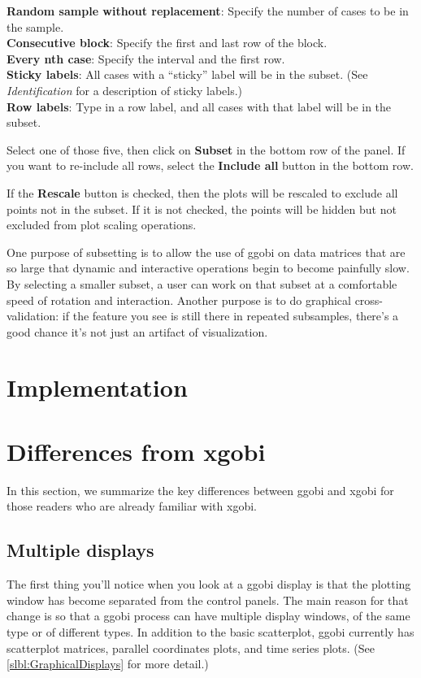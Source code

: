 \documentclass[11pt]{article}
\begin{document}
{\bf Random sample without replacement}:  Specify the number of
cases to be in the sample.
\\{\bf Consecutive block}:  Specify the first and last row of the block.
\\{\bf Every nth case}:  Specify the interval and the first row.
\\{\bf Sticky labels}:  All cases with a ``sticky'' label will
  be in the subset.  (See {\em Identification} for a description
  of sticky labels.)
\\{\bf Row labels}: Type in a row label, and all cases with that
  label will be in the subset.

Select one of those five, then click on {\bf Subset} in the
bottom row of the panel.  If you want to re-include all rows, 
select the {\bf Include all} button in the bottom row.

If the {\bf Rescale} button is checked, then the plots will be
rescaled to exclude all points not in the subset.  If it is
not checked, the points will be hidden but not excluded from
plot scaling operations.

One purpose of subsetting is to allow the use of ggobi on data matrices
that are so large that dynamic and interactive operations begin to
become painfully slow.  By selecting a smaller subset, a user can
work on that subset at a comfortable speed of rotation and
interaction.  Another purpose is to do graphical cross-validation:
if the feature you see is still there in repeated subsamples, there's
a good chance it's not just an artifact of visualization.

\section{Implementation}

\section{Differences from xgobi}
\label{slbl:xgobi}

In this section, we summarize the key differences between ggobi
and xgobi for those readers who are already familiar with xgobi.

\subsection {Multiple displays}

The first thing you'll notice when you look at a ggobi display is
that the plotting window has become separated from the control
panels.  The main reason for that change is so that a ggobi process
can have multiple display windows, of the same type or of different
types.  In addition to the basic scatterplot, ggobi currently has
scatterplot matrices, parallel coordinates plots, and time series
plots.  (See \ref{slbl:GraphicalDisplays} for more detail.)
\end{document}
